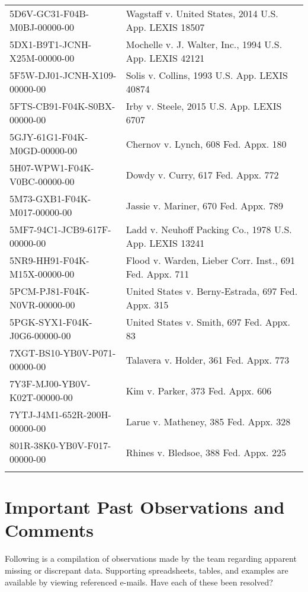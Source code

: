 \documentclass[10pt, letterpaper]{article}
\begin{document}
\begin{spacing}{1.0}
\begin{longtable}{p{2.5in}p{4in}}
    5D6V-GC31-F04B-M0BJ-00000-00 & Wagstaff v. United States, 2014 U.S. App. LEXIS 18507\\
    5DX1-B9T1-JCNH-X25M-00000-00 & Mochelle v. J. Walter, Inc., 1994 U.S. App. LEXIS 42121\\
    5F5W-DJ01-JCNH-X109-00000-00 & Solis v. Collins, 1993 U.S. App. LEXIS 40874\\
    5FTS-CB91-F04K-S0BX-00000-00 & Irby v. Steele, 2015 U.S. App. LEXIS 6707\\
    5GJY-61G1-F04K-M0GD-00000-00 & Chernov v. Lynch, 608 Fed. Appx. 180\\
    5H07-WPW1-F04K-V0BC-00000-00 & Dowdy v. Curry, 617 Fed. Appx. 772\\
    5M73-GXB1-F04K-M017-00000-00 & Jassie v. Mariner, 670 Fed. Appx. 789\\
    5MF7-94C1-JCB9-617F-00000-00 & Ladd v. Neuhoff Packing Co., 1978 U.S. App. LEXIS 13241\\
    5NR9-HH91-F04K-M15X-00000-00 & Flood v. Warden, Lieber Corr. Inst., 691 Fed. Appx. 711\\
    5PCM-PJ81-F04K-N0VR-00000-00 & United States v. Berny-Estrada, 697 Fed. Appx. 315\\
    5PGK-SYX1-F04K-J0G6-00000-00 & United States v. Smith, 697 Fed. Appx. 83\\
    7XGT-BS10-YB0V-P071-00000-00 & Talavera v. Holder, 361 Fed. Appx. 773\\
    7Y3F-MJ00-YB0V-K02T-00000-00 & Kim v. Parker, 373 Fed. Appx. 606\\
    7YTJ-J4M1-652R-200H-00000-00 & Larue v. Matheney, 385 Fed. Appx. 328\\
    801R-38K0-YB0V-F017-00000-00 & Rhines v. Bledsoe, 388 Fed. Appx. 225\\[4pt]
    \hline
    \label{tb:MissingTopicSample}
\end{longtable}    

\normalsize

\clearpage

\section{Important Past Observations and Comments}

Following is a compilation of observations made by the team regarding apparent missing or discrepant data.  Supporting spreadsheets, tables, and examples are available by viewing referenced e-mails.  Have each of these been resolved?

\begin{longtable}{p{1.5in}p{5in}}
    

\end{longtable}
\end{spacing}
\end{document}
